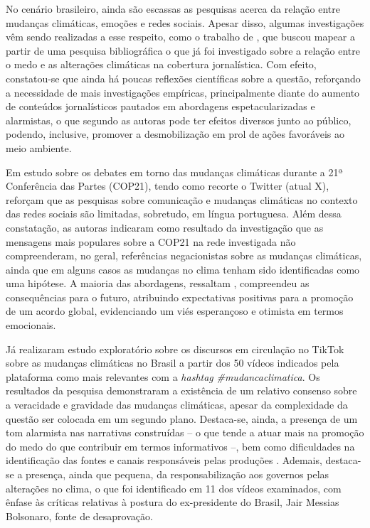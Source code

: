 \documentclass[portuguese]{textolivre}
\begin{document}
No cenário brasileiro, ainda são escassas as pesquisas acerca da relação entre mudanças climáticas, emoções e redes sociais. Apesar disso, algumas investigações vêm sendo realizadas a esse respeito, como o trabalho de \textcite{balbe2020jornalismo}, que buscou mapear a partir de uma pesquisa bibliográfica o que já foi investigado sobre a relação entre o medo e as alterações climáticas na cobertura jornalística. Com efeito, constatou-se que ainda há poucas reflexões científicas sobre a questão, reforçando a necessidade de mais investigações empíricas, principalmente diante do aumento de conteúdos jornalísticos pautados em abordagens espetacularizadas e alarmistas, o que segundo as autoras pode ter efeitos diversos junto ao público, podendo, inclusive, promover a desmobilização em prol de ações favoráveis ao meio ambiente.

Em estudo sobre os debates em torno das mudanças climáticas durante a 21ª Conferência das Partes (COP21), tendo como recorte o Twitter (atual X), \textcite{balbe2017twitter} reforçam que as pesquisas sobre comunicação e mudanças climáticas no contexto das redes sociais são limitadas, sobretudo, em língua portuguesa. Além dessa constatação, as autoras indicaram como resultado da investigação que as mensagens mais populares sobre a COP21 na rede investigada não compreenderam, no geral, referências negacionistas sobre as mudanças climáticas, ainda que em alguns casos as mudanças no clima tenham sido identificadas como uma hipótese. A maioria das abordagens, ressaltam \textcite{balbe2017twitter}, compreendeu as consequências para o futuro, atribuindo expectativas positivas para a promoção de um acordo global, evidenciando um viés esperançoso e otimista em termos emocionais.

Já \textcite{evangelista2024narrativas} realizaram estudo exploratório sobre os discursos em circulação no TikTok sobre as mudanças climáticas no Brasil a partir dos 50 vídeos indicados pela plataforma como mais relevantes com a \textit{hashtag} \textit{\#mudancaclimatica}. Os resultados da pesquisa demonstraram a existência de um relativo consenso sobre a veracidade e gravidade das mudanças climáticas, apesar da complexidade da questão ser colocada em um segundo plano. Destaca-se, ainda, a presença de um tom alarmista nas narrativas construídas -- o que tende a atuar mais na promoção do medo do que contribuir em termos informativos --, bem como dificuldades na identificação das fontes e canais responsáveis pelas produções \cite{evangelista2024narrativas}. Ademais, destaca-se a presença, ainda que pequena, da responsabilização aos governos pelas alterações no clima, o que foi identificado em 11 dos vídeos examinados, com ênfase às críticas relativas à postura do ex-presidente do Brasil, Jair Messias Bolsonaro, fonte de desaprovação.
\end{document}
